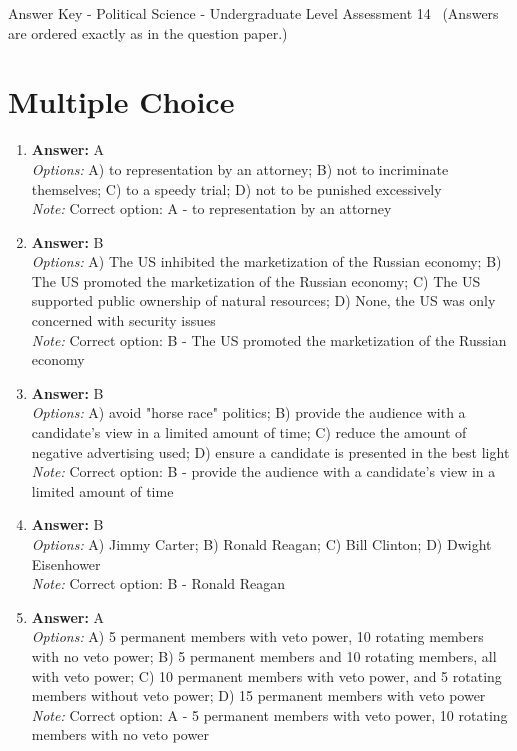 \documentclass[12pt]{article}
\begin{document}
\begin{center}
Answer Key - Political Science - Undergraduate Level Assessment 14 \
\small (Answers are ordered exactly as in the question paper.)
\end{center}

\section*{Multiple Choice}
\begin{enumerate}[label=\arabic*.]
\item \textbf{Answer:} A
\\ \textit{Options:} A) to representation by an attorney; B) not to incriminate themselves; C) to a speedy trial; D) not to be punished excessively
\\ \textit{Note:} Correct option: A - to representation by an attorney
\item \textbf{Answer:} B
\\ \textit{Options:} A) The US inhibited the marketization of the Russian economy; B) The US promoted the marketization of the Russian economy; C) The US supported public ownership of natural resources; D) None, the US was only concerned with security issues
\\ \textit{Note:} Correct option: B - The US promoted the marketization of the Russian economy
\item \textbf{Answer:} B
\\ \textit{Options:} A) avoid "horse race" politics; B) provide the audience with a candidate's view in a limited amount of time; C) reduce the amount of negative advertising used; D) ensure a candidate is presented in the best light
\\ \textit{Note:} Correct option: B - provide the audience with a candidate's view in a limited amount of time
\item \textbf{Answer:} B
\\ \textit{Options:} A) Jimmy Carter; B) Ronald Reagan; C) Bill Clinton; D) Dwight Eisenhower
\\ \textit{Note:} Correct option: B - Ronald Reagan
\item \textbf{Answer:} A
\\ \textit{Options:} A) 5 permanent members with veto power, 10 rotating members with no veto power; B) 5 permanent members and 10 rotating members, all with veto power; C) 10 permanent members with veto power, and 5 rotating members without veto power; D) 15 permanent members with veto power
\\ \textit{Note:} Correct option: A - 5 permanent members with veto power, 10 rotating members with no veto power
\end{enumerate}
\end{document}
